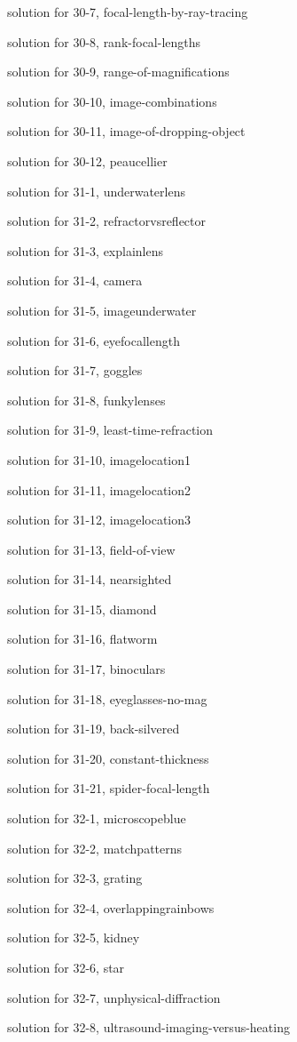 \documentclass{problems}
\begin{document}
solution for 30-7, focal-length-by-ray-tracing

solution for 30-8, rank-focal-lengths

solution for 30-9, range-of-magnifications

solution for 30-10, image-combinations

solution for 30-11, image-of-dropping-object

solution for 30-12, peaucellier

solution for 31-1, underwaterlens

solution for 31-2, refractorvsreflector

solution for 31-3, explainlens

solution for 31-4, camera

solution for 31-5, imageunderwater

solution for 31-6, eyefocallength

solution for 31-7, goggles

solution for 31-8, funkylenses

solution for 31-9, least-time-refraction

solution for 31-10, imagelocation1

solution for 31-11, imagelocation2

solution for 31-12, imagelocation3

solution for 31-13, field-of-view

solution for 31-14, nearsighted

solution for 31-15, diamond

solution for 31-16, flatworm

solution for 31-17, binoculars

solution for 31-18, eyeglasses-no-mag

solution for 31-19, back-silvered

solution for 31-20, constant-thickness

solution for 31-21, spider-focal-length

solution for 32-1, microscopeblue

solution for 32-2, matchpatterns

solution for 32-3, grating

solution for 32-4, overlappingrainbows

solution for 32-5, kidney

solution for 32-6, star

solution for 32-7, unphysical-diffraction

solution for 32-8, ultrasound-imaging-versus-heating
\end{document}
